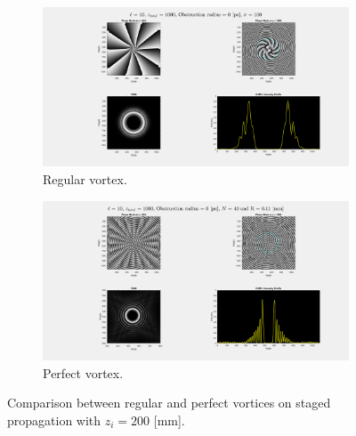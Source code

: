 \begin{figure}[htbp]
    \centering
    \begin{subfigure}[b]{0.45\textwidth}
        \centering
        \includegraphics[width=\textwidth]{images/Appendices/Additional_Results/Staged_Propagation/type=0_r=0_zi=200_zf=1000.png}
        \caption{Regular vortex.}
    \end{subfigure}
    \hfill
    \begin{subfigure}[b]{0.45\textwidth}
        \centering
        \includegraphics[width=\textwidth]{images/Appendices/Additional_Results/Staged_Propagation/type=1_r=0_zi=200_zf=1000.png}
        \caption{Perfect vortex.}
    \end{subfigure}
    \caption{Comparison between regular and perfect vortices on staged propagation with $z_i=200$ [mm].}
    \label{fig:staged_zi=200}
\end{figure}

